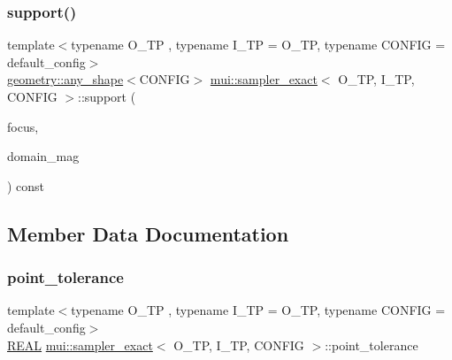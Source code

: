 \mbox{\label{classmui_1_1sampler__exact_af7ea697c027c0e082087dae5e57959ca}} 
\subsubsection{\texorpdfstring{support()}{support()}}
{\footnotesize\ttfamily template$<$typename O\+\_\+\+TP , typename I\+\_\+\+TP  = O\+\_\+\+TP, typename C\+O\+N\+F\+IG  = default\+\_\+config$>$ \\
\hyperlink{classmui_1_1geometry_1_1any__shape}{geometry\+::any\+\_\+shape}$<$C\+O\+N\+F\+IG$>$ \hyperlink{classmui_1_1sampler__exact}{mui\+::sampler\+\_\+exact}$<$ O\+\_\+\+TP, I\+\_\+\+TP, C\+O\+N\+F\+IG $>$\+::support (\begin{DoxyParamCaption}\item[{\hyperlink{classmui_1_1sampler__exact_a789e8bf4cf1dd6319c67ab7a60458948}{point\+\_\+type}}]{focus,  }\item[{\hyperlink{classmui_1_1sampler__exact_a204186f8735dcdfe021c7e3a36a077bf}{R\+E\+AL}}]{domain\+\_\+mag }\end{DoxyParamCaption}) const\hspace{0.3cm}{\ttfamily [inline]}}



\subsection{Member Data Documentation}
\mbox{\label{classmui_1_1sampler__exact_a2f0fa42e305d801cfe9bce62b5d0b097}} 
\subsubsection{\texorpdfstring{point\+\_\+tolerance}{point\_tolerance}}
{\footnotesize\ttfamily template$<$typename O\+\_\+\+TP , typename I\+\_\+\+TP  = O\+\_\+\+TP, typename C\+O\+N\+F\+IG  = default\+\_\+config$>$ \\
\hyperlink{classmui_1_1sampler__exact_a204186f8735dcdfe021c7e3a36a077bf}{R\+E\+AL} \hyperlink{classmui_1_1sampler__exact}{mui\+::sampler\+\_\+exact}$<$ O\+\_\+\+TP, I\+\_\+\+TP, C\+O\+N\+F\+IG $>$\+::point\+\_\+tolerance\hspace{0.3cm}{\ttfamily [protected]}}


